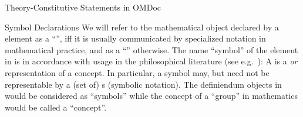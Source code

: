 \begin{omgroup}[short=Mathematical Statements,id=statements]
\begin{omgroup}[id=constitutive-statements]{Theory-Constitutive Statements in OMDoc}
\begin{module}[id=constitutive-statements]
\begin{omgroup}[id=symbol-dec]{Symbol Declarations}
We will refer to the mathematical object declared by a  element as a
``{}'', iff it is usually communicated by specialized notation in
mathematical practice, and as a ``{}'' otherwise.  The name ``symbol''
of the  element in \omdoc is in accordance with usage in the
philosophical literature (see e.g.~\cite{NewSim:cseisas81}): A {} is a
{\emph{{} or
    {}}} representation of a concept.  In
particular, a symbol may, but need not be representable by a (set of) {s}
(symbolic notation).  The definiendum objects in {} would be considered
as ``symbols'' while the concept of a ``group'' in mathematics would be called a
``concept''.
  

\end{omgroup}
\end{module}
\end{omgroup}
\end{omgroup}
